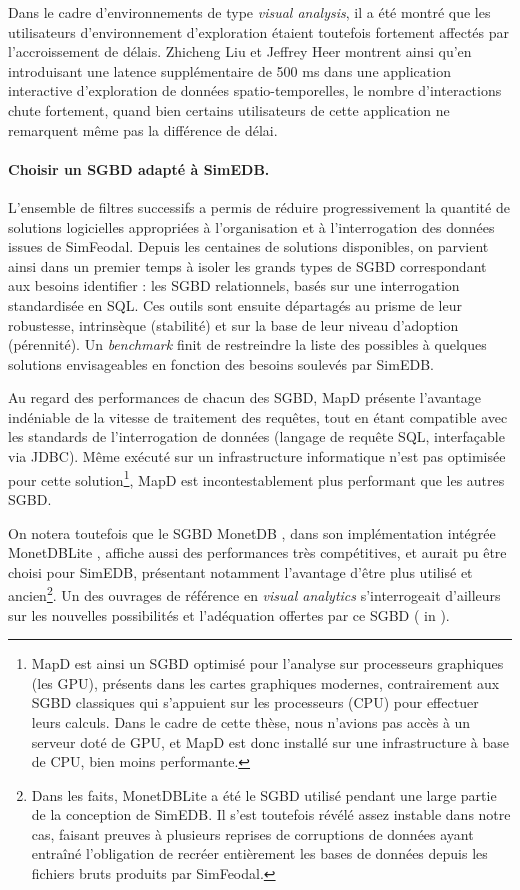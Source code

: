 Dans le cadre d'environnements de type \textit{visual analysis}, il a été montré que les utilisateurs d'environnement d'exploration étaient toutefois fortement affectés par l'accroissement de délais.
Zhicheng Liu et Jeffrey Heer \autocite{liu_effects_2014} montrent ainsi qu'en introduisant une latence supplémentaire de 500 ms dans une application interactive d'exploration de données spatio-temporelles, le nombre d'interactions chute fortement, quand bien certains utilisateurs de cette application ne remarquent même pas la différence de délai.

\paragraph{Choisir un SGBD adapté à SimEDB.} L'ensemble de filtres successifs a permis de réduire progressivement la quantité de solutions logicielles appropriées à l'organisation et à l'interrogation des données issues de SimFeodal.
Depuis les centaines de solutions disponibles, on parvient ainsi dans un premier temps à isoler les grands types de SGBD correspondant aux besoins identifier : les SGBD relationnels, basés sur une interrogation standardisée en SQL.
Ces outils sont ensuite départagés au prisme de leur robustesse, intrinsèque (stabilité) et sur la base de leur niveau d'adoption (pérennité).
Un \textit{benchmark} finit de restreindre la liste des possibles à quelques solutions envisageables en fonction des besoins soulevés par SimEDB.

Au regard des performances de chacun des SGBD, MapD \autocite{root_mapd_2016} présente l'avantage indéniable de la vitesse de traitement des requêtes, tout en étant compatible avec les standards de l'interrogation de données (langage de requête SQL, interfaçable via \textsf{JDBC}).
Même exécuté sur un infrastructure informatique n'est pas optimisée pour cette solution\footnote{
	MapD est ainsi un SGBD optimisé pour l'analyse sur processeurs graphiques (les GPU), présents dans les cartes graphiques modernes, contrairement aux SGBD classiques qui s'appuient sur les processeurs (CPU) pour effectuer leurs calculs.
	Dans le cadre de cette thèse, nous n'avions pas accès à un serveur doté de GPU, et MapD est donc installé sur une infrastructure à base de CPU, bien moins performante.
}, MapD est incontestablement plus performant que les autres SGBD.

On notera toutefois que le SGBD MonetDB \autocite{vermeij_monetdb_2008}, dans son implémentation intégrée MonetDBLite \autocite{raasveldt_monetdblite_2018}, affiche aussi des performances très compétitives, et aurait pu être choisi pour SimEDB, présentant notamment l'avantage d'être plus utilisé et ancien\footnote{
	Dans les faits, MonetDBLite a été le SGBD utilisé pendant une large partie de la conception de SimEDB.
	Il s'est toutefois révélé assez instable dans notre cas, faisant preuves à plusieurs reprises de corruptions de données ayant entraîné l'obligation de recréer entièrement les bases de données depuis les fichiers bruts produits par SimFeodal.
}.
Un des ouvrages de référence en \textit{visual analytics} s'interrogeait d'ailleurs sur les nouvelles possibilités et l'adéquation offertes par ce SGBD (\cite[105]{fekete_infrastructure_2010} in \cite{keim_mastering_2010}).

